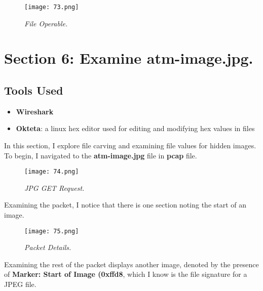 \begin{figure}[H]
    \setlength{\abovecaptionskip}{20pt}
    \setlength{\belowcaptionskip}{0pt}
    \centering
    \texttt{[image: 73.png]}
    \captionsetup{justification=centering}
    \caption{\textit{File Operable.}}
    \label{fig:73}
\end{figure}
\vspace{-10pt}

\section{Section 6: Examine \textbf{atm-image.jpg}.}
\subsection{Tools Used}
\begin{itemize}
    \item \textbf{Wireshark}
    \item \textbf{Okteta}: a linux hex editor used for editing and modifying hex values in files
\end{itemize}

In this section, I explore file carving and examining file values for hidden images. To begin, I navigated to the \textbf{atm-image.jpg} file in \textbf{pcap} file.

\begin{figure}[H]
    \setlength{\abovecaptionskip}{20pt}
    \setlength{\belowcaptionskip}{0pt}
    \centering
    \texttt{[image: 74.png]}
    \captionsetup{justification=centering}
    \caption{\textit{JPG GET Request.}}
    \label{fig:74}
\end{figure}
\vspace{-10pt}

Examining the packet, I notice that there is one section noting the start of an image.

\begin{figure}[H]
    \setlength{\abovecaptionskip}{20pt}
    \setlength{\belowcaptionskip}{0pt}
    \centering
    \texttt{[image: 75.png]}
    \captionsetup{justification=centering}
    \caption{\textit{Packet Details.}}
    \label{fig:75}
\end{figure}
\vspace{-10pt}

Examining the rest of the packet displays another image, denoted by the presence of \textbf{Marker: Start of Image (0xffd8}, which I know is the file signature for a JPEG file. 

